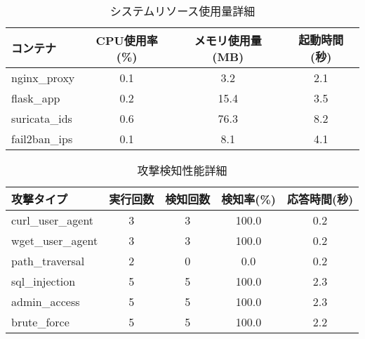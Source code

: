 
\begin{table}[H]
\centering
\caption{システムリソース使用量詳細}
\begin{tabular}{@{}lccc@{}}
\toprule
コンテナ & CPU使用率(\%) & メモリ使用量(MB) & 起動時間(秒) \\
\midrule
nginx_proxy & 0.1 & 3.2 & 2.1 \\
flask_app & 0.2 & 15.4 & 3.5 \\
suricata_ids & 0.6 & 76.3 & 8.2 \\
fail2ban_ips & 0.1 & 8.1 & 4.1 \\
\bottomrule
\end{tabular}
\end{table}

\begin{table}[H]
\centering
\caption{攻撃検知性能詳細}
\begin{tabular}{@{}lcccc@{}}
\toprule
攻撃タイプ & 実行回数 & 検知回数 & 検知率(\%) & 応答時間(秒) \\
\midrule
curl_user_agent & 3 & 3 & 100.0 & 0.2 \\
wget_user_agent & 3 & 3 & 100.0 & 0.2 \\
path_traversal & 2 & 0 & 0.0 & 0.2 \\
sql_injection & 5 & 5 & 100.0 & 2.3 \\
admin_access & 5 & 5 & 100.0 & 2.3 \\
brute_force & 5 & 5 & 100.0 & 2.2 \\
\bottomrule
\end{tabular}
\end{table}
